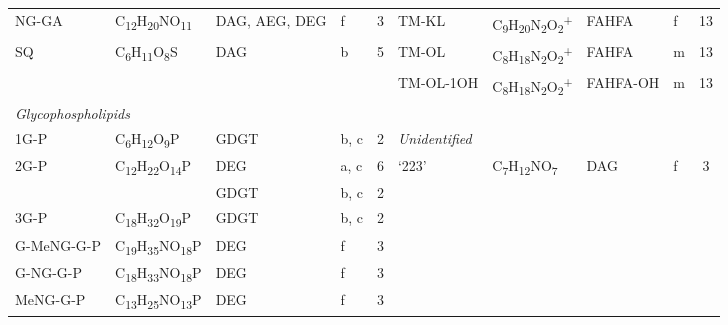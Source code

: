{\begin{landscape}
\begin{table}
\begin{adjustbox}{width=\textheight,keepaspectratio}
\begin{threeparttable}
\begin{tabular}{lrllcrrrrr}
NG-GA & \multicolumn{1}{l}{C\textsubscript{12}H\textsubscript{20}NO\textsubscript{11}} & DAG, AEG, DEG & f     & 3     & \multicolumn{1}{l}{TM-KL} & \multicolumn{1}{l}{C\textsubscript{9}H\textsubscript{20}N\textsubscript{2}O\textsubscript{2}\textsuperscript{+}} & \multicolumn{1}{l}{FAHFA} & \multicolumn{1}{l}{f} & \multicolumn{1}{c}{13} \\
SQ    & \multicolumn{1}{l}{C\textsubscript{6}H\textsubscript{11}O\textsubscript{8}S} & DAG   & b     & 5     & \multicolumn{1}{l}{TM-OL} & \multicolumn{1}{l}{C\textsubscript{8}H\textsubscript{18}N\textsubscript{2}O\textsubscript{2}\textsuperscript{+}} & \multicolumn{1}{l}{FAHFA} & \multicolumn{1}{l}{m} & \multicolumn{1}{c}{13} \\
      &       &       &       &       & \multicolumn{1}{l}{TM-OL-1OH} & \multicolumn{1}{l}{C\textsubscript{8}H\textsubscript{18}N\textsubscript{2}O\textsubscript{2}\textsuperscript{+}} & \multicolumn{1}{l}{FAHFA-OH} & \multicolumn{1}{l}{m} & \multicolumn{1}{c}{13} \\
\multicolumn{2}{l}{\textit{Glycophospholipids}} &       &       &       &       &       &       &       &  \\
1G-P  & \multicolumn{1}{l}{C\textsubscript{6}H\textsubscript{12}O\textsubscript{9}P} & GDGT  & b, c  & 2     & \multicolumn{2}{l}{\textit{Unidentified}} &       &       &  \\
2G-P  & \multicolumn{1}{l}{C\textsubscript{12}H\textsubscript{22}O\textsubscript{14}P} & DEG   & a, c  & 6     & \multicolumn{1}{l}{`223'} & \multicolumn{1}{l}{C\textsubscript{7}H\textsubscript{12}NO\textsubscript{7}} & \multicolumn{1}{l}{DAG} & \multicolumn{1}{l}{f} & \multicolumn{1}{c}{3} \\
      &       & GDGT  & b, c  & 2     &       &       &       &       &  \\
3G-P  & \multicolumn{1}{l}{C\textsubscript{18}H\textsubscript{32}O\textsubscript{19}P} & GDGT  & b, c  & 2     &       &       &       &       &  \\
G-MeNG-G-P & \multicolumn{1}{l}{C\textsubscript{19}H\textsubscript{35}NO\textsubscript{18}P} & DEG   & f     & 3     &       &       &       &       &  \\
G-NG-G-P & \multicolumn{1}{l}{C\textsubscript{18}H\textsubscript{33}NO\textsubscript{18}P} & DEG   & f     & 3     &       &       &       &       &  \\
MeNG-G-P & \multicolumn{1}{l}{C\textsubscript{13}H\textsubscript{25}NO\textsubscript{13}P} & DEG   & f     & 3     &       &       &       &       &  \\

\end{tabular}
\end{threeparttable}
\end{adjustbox}
\end{table}
\end{landscape}}
